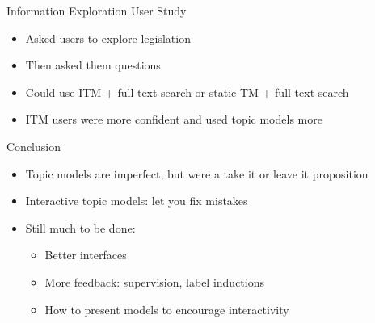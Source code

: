 \documentclass[compress]{beamer}
\begin{document}
\begin{frame}{Information Exploration User Study}

\begin{itemize}
	\item Asked users to explore legislation
	\item Then asked them questions
	\item Could use ITM + full text search or static TM + full text search
	\item ITM users were more confident and used topic models more
\end{itemize}

\end{frame}

\begin{frame}{Conclusion}

	\begin{itemize}
		\item Topic models are imperfect, but were a take it or leave it proposition
		\item Interactive topic models: let you fix mistakes
		\item Still much to be done:
			\begin{itemize}
				\item Better interfaces
				\item More feedback: supervision, label inductions
				\item How to present models to encourage interactivity
			\end{itemize}
	
	\end{itemize}

\end{frame}
\end{document}

